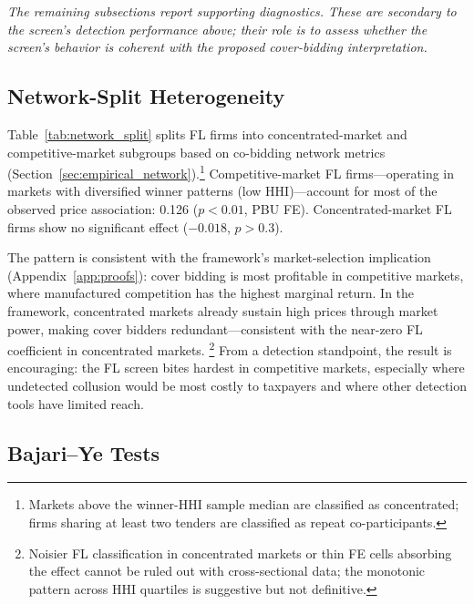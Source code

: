 


\medskip
\noindent\textit{The remaining subsections report supporting diagnostics.
These are secondary to the screen's detection performance above; their
role is to assess whether the screen's behavior is coherent with the
proposed cover-bidding interpretation.}
\medskip

\subsection{Network-Split Heterogeneity}
\label{sec:results_network}

Table~\ref{tab:network_split} splits FL firms into
concentrated-market and competitive-market subgroups based on
co-bidding network metrics (Section~\ref{sec:empirical_network}).\footnote{Markets
above the winner-HHI sample median are classified as concentrated;
firms sharing at least two tenders are classified as repeat
co-participants.}
Competitive-market FL firms---operating in markets with diversified
winner patterns (low HHI)---account for most of the observed price association: 0.126
($p < 0.01$, PBU FE). Concentrated-market FL firms show no significant
effect ($-0.018$, $p > 0.3$).

The pattern is consistent with the framework's market-selection
implication (Appendix~\ref{app:proofs}): cover bidding is most
profitable in competitive
markets, where manufactured competition has the highest marginal
return. In the framework, concentrated markets already sustain high prices
through market power, making cover bidders redundant---consistent
with the near-zero FL coefficient in concentrated markets.%
\footnote{Noisier FL classification in concentrated markets or thin FE
cells absorbing the effect cannot be ruled out with cross-sectional
data; the monotonic pattern across HHI quartiles is suggestive but not
definitive.}
From a detection standpoint, the result is encouraging: the FL screen
bites hardest in competitive markets, especially where undetected collusion would be most costly to
taxpayers and where other detection tools have limited reach.



\subsection{Bajari--Ye Tests}
\label{sec:results_bajari}

